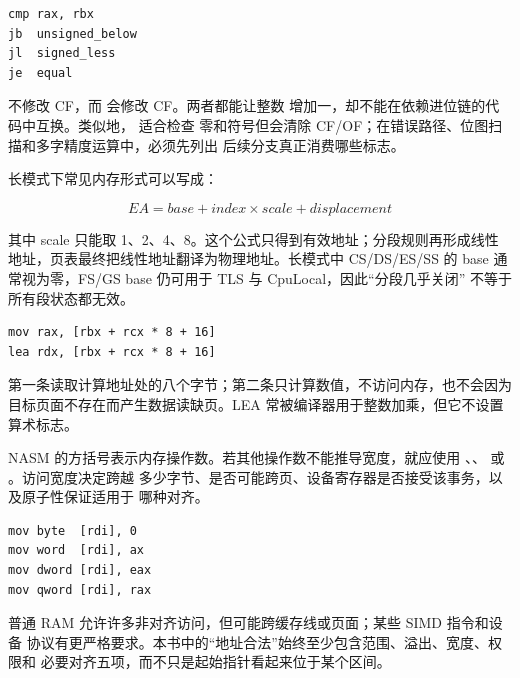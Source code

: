 \begin{lstlisting}
cmp rax, rbx
jb  unsigned_below
jl  signed_less
je  equal
\end{lstlisting}

 不修改 CF，而  会修改 CF。两者都能让整数
增加一，却不能在依赖进位链的代码中互换。类似地， 适合检查
零和符号但会清除 CF/OF；在错误路径、位图扫描和多字精度运算中，必须先列出
后续分支真正消费哪些标志。

长模式下常见内存形式可以写成：

\[
EA = base + index \times scale + displacement
\]

其中 scale 只能取 1、2、4、8。这个公式只得到有效地址；分段规则再形成线性
地址，页表最终把线性地址翻译为物理地址。长模式中 CS/DS/ES/SS 的 base
通常视为零，FS/GS base 仍可用于 TLS 与 CpuLocal，因此“分段几乎关闭”
不等于所有段状态都无效。

\begin{lstlisting}
mov rax, [rbx + rcx * 8 + 16]
lea rdx, [rbx + rcx * 8 + 16]
\end{lstlisting}

第一条读取计算地址处的八个字节；第二条只计算数值，不访问内存，也不会因为
目标页面不存在而产生数据读缺页。LEA 常被编译器用于整数加乘，但它不设置
算术标志。

NASM 的方括号表示内存操作数。若其他操作数不能推导宽度，就应使用
、、 或 。访问宽度决定跨越
多少字节、是否可能跨页、设备寄存器是否接受该事务，以及原子性保证适用于
哪种对齐。

\begin{lstlisting}
mov byte  [rdi], 0
mov word  [rdi], ax
mov dword [rdi], eax
mov qword [rdi], rax
\end{lstlisting}

普通 RAM 允许许多非对齐访问，但可能跨缓存线或页面；某些 SIMD 指令和设备
协议有更严格要求。本书中的“地址合法”始终至少包含范围、溢出、宽度、权限和
必要对齐五项，而不只是起始指针看起来位于某个区间。

